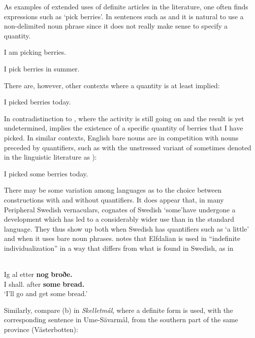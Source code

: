 As examples of extended uses of definite articles in the literature, one often finds expressions such as ‘pick berries’. In sentences such as  and  it is natural to use a non-delimited noun phrase since it does not really make sense to specify a quantity. 

\ea
\gl \label{bkm:Ref78699401}I am picking berries.  
 \z

 \ea 
 \gl \label{bkm:Ref95014405}I pick berries in summer.
 \z 

There are, however, other contexts where a quantity is at least implied:

\ea
\gl \label{bkm:Ref78699451}I picked berries today. 
\z 

In contradistinction to , where the activity is still going on and the result is yet undetermined,  implies the existence of a specific quantity of berries that I have picked. In similar contexts, English bare nouns are in competition with nouns preceded by quantifiers, such as with the unstressed variant of  sometimes denoted in the linguistic literature as ):

\ea
\gl I picked some berries today.  
\z


There may be some variation among languages as to the choice between constructions with and without quantifiers. It does appear that, in many Peripheral Swedish vernaculars, cognates of Swedish  ‘some’\textstyleLinguisticExample{ }have undergone a development which has led to a considerably wider use than in the standard language. They thus show up both when Swedish has quantifiers such as  ‘a little’ and when it uses bare noun phrases. \citet[110]{Levander1909} notes that Elfdalian is used in “indefinite individualization” in a way that differs from what is found in Swedish, as in 

\ea \label{} 
\\
\gll Ig  al  etter  \textbf{nog} \textbf{  broðe.}\\
I  shall.{\prs}  after  \textbf{some} \textbf{bread.{\dat}}\\
\glt ‘I’ll go and get some bread.’ 

\z

Similarly, compare (b) in \textit{Skelletmål}, where a definite form  is used, with the corresponding sentence in Ume-Sävarmål, from the southern part of the same province (Västerbotten):

